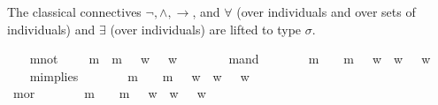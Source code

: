 \begin{isabellebody}
\begin{isamarkuptext}%
The classical connectives $\neg, \wedge, \rightarrow$, and $\forall$
(over individuals and over sets of individuals) and $\exists$ (over individuals) are
lifted to type $\sigma$.%
\end{isamarkuptext}%
\isamarkuptrue%
\ \ \isamarkupfalse%
\ mnot\ {\isacharcolon}{\isacharcolon}\ {\isachardoublequoteopen}{\isasymsigma}\ {\isasymRightarrow}\ {\isasymsigma}{\isachardoublequoteclose}\ {\isacharparenleft}{\isachardoublequoteopen}m{\isasymnot}{\isachardoublequoteclose}{\isacharparenright}\ \ {\isachardoublequoteopen}m{\isasymnot}\ {\isasymphi}\ {\isasymequiv}\ {\isacharparenleft}{\isasymlambda}w{\isachardot}\ {\isasymnot}\ {\isasymphi}\ w{\isacharparenright}{\isachardoublequoteclose}\ \ \ \ \isanewline
\ \ \isamarkupfalse%
\ mand\ {\isacharcolon}{\isacharcolon}\ {\isachardoublequoteopen}{\isasymsigma}\ {\isasymRightarrow}\ {\isasymsigma}\ {\isasymRightarrow}\ {\isasymsigma}{\isachardoublequoteclose}\ {\isacharparenleft}\ {\isachardoublequoteopen}m{\isasymand}{\isachardoublequoteclose}\ {}{}{\isacharparenright}\ \ {\isachardoublequoteopen}{\isasymphi}\ m{\isasymand}\ {\isasympsi}\ {\isasymequiv}\ {\isacharparenleft}{\isasymlambda}w{\isachardot}\ {\isasymphi}\ w\ {\isasymand}\ {\isasympsi}\ w{\isacharparenright}{\isachardoublequoteclose}\ \ \ \isanewline
\ \ \isamarkupfalse%
\ mimplies\ {\isacharcolon}{\isacharcolon}\ {\isachardoublequoteopen}{\isasymsigma}\ {\isasymRightarrow}\ {\isasymsigma}\ {\isasymRightarrow}\ {\isasymsigma}{\isachardoublequoteclose}\ {\isacharparenleft}\ {\isachardoublequoteopen}m{\isasymRightarrow}{\isachardoublequoteclose}\ {}{}{\isacharparenright}\ \ {\isachardoublequoteopen}{\isasymphi}\ m{\isasymRightarrow}\ {\isasympsi}\ {\isasymequiv}\ {\isacharparenleft}{\isasymlambda}w{\isachardot}\ {\isasymphi}\ w\ {\isasymlongrightarrow}\ {\isasympsi}\ w{\isacharparenright}{\isachardoublequoteclose}\isanewline
\ \ \isamarkupfalse%
\ mor\ {\isacharcolon}{\isacharcolon}\ {\isachardoublequoteopen}{\isasymsigma}\ {\isasymRightarrow}\ {\isasymsigma}\ {\isasymRightarrow}\ {\isasymsigma}{\isachardoublequoteclose}\ {\isacharparenleft}\ {\isachardoublequoteopen}m{\isasymor}{\isachardoublequoteclose}\ {}{}{\isacharparenright}\ \ {\isachardoublequoteopen}{\isasymphi}\ m{\isasymor}\ {\isasympsi}\ {\isasymequiv}\ {\isacharparenleft}{\isasymlambda}w{\isachardot}\ {\isasymphi}\ w\ {\isasymor}\ {\isasympsi}\ w{\isacharparenright}{\isachardoublequoteclose}\isanewline

\end{isabellebody}
